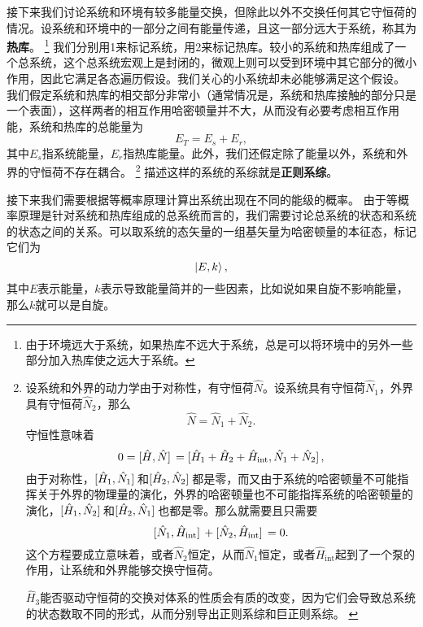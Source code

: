 \documentclass[hyperref, UTF8, a4paper]{ctexart}
\begin{document}
接下来我们讨论系统和环境有较多能量交换，但除此以外不交换任何其它守恒荷的情况。设系统和环境中的一部分之间有能量传递，且这一部分远大于系统，称其为\textbf{热库}。%
\footnote{由于环境远大于系统，如果热库不远大于系统，总是可以将环境中的另外一些部分加入热库使之远大于系统。}%
我们分别用1来标记系统，用2来标记热库。较小的系统和热库组成了一个总系统，这个总系统宏观上是封闭的，微观上则可以受到环境中其它部分的微小作用，因此它满足各态遍历假设。我们关心的小系统却未必能够满足这个假设。
我们假定系统和热库的相交部分非常小（通常情况是，系统和热库接触的部分只是一个表面），这样两者的相互作用哈密顿量并不大，从而没有必要考虑相互作用能，系统和热库的总能量为
\begin{equation}
    E_T = E_s + E_r,
    \label{eq:total-energy}
\end{equation}
其中$E_s$指系统能量，$E_r$指热库能量。此外，我们还假定除了能量以外，系统和外界的守恒荷不存在耦合。%
\footnote{设系统和外界的动力学由于对称性，有守恒荷$\hat{N}$。设系统具有守恒荷$\hat{N}_1$，外界具有守恒荷$\hat{N}_2$，那么
\[
    \hat{N} = \hat{N}_1 + \hat{N}_2.
\]
守恒性意味着
\[
    0 = \comm*{\hat{H}}{\hat{N}} = \comm*{\hat{H}_1 + \hat{H}_2 + \hat{H}_\text{int}}{\hat{N}_1 + \hat{N}_2},
\]
由于对称性，$\comm*{\hat{H}_1}{\hat{N}_1}$和$\comm*{\hat{H}_2}{\hat{N}_2}$都是零，而又由于系统的哈密顿量不可能指挥关于外界的物理量的演化，外界的哈密顿量也不可能指挥系统的哈密顿量的演化，$\comm*{\hat{H}_1}{\hat{N}_2}$和$\comm*{\hat{H}_2}{\hat{N}_1}$也都是零。那么就需要且只需要
\[
    \comm*{\hat{N}_1}{\hat{H}_\text{int}} + \comm*{\hat{N}_2}{\hat{H}_\text{int}} = 0.
\]
这个方程要成立意味着，或者$\hat{N}_2$恒定，从而$\hat{N}_1$恒定，或者$\hat{H}_\text{int}$起到了一个泵的作用，让系统和外界能够交换守恒荷。

$\hat{H}_3$能否驱动守恒荷的交换对体系的性质会有质的改变，因为它们会导致总系统的状态数取不同的形式，从而分别导出正则系综和巨正则系综。
\label{note:without-other-decoupling}}%
描述这样的系统的系综就是\textbf{正则系综}。

接下来我们需要根据等概率原理计算出系统出现在不同的能级的概率。
由于等概率原理是针对系统和热库组成的总系统而言的，我们需要讨论总系统的状态和系统的状态之间的关系。可以取系统的态矢量的一组基矢量为哈密顿量的本征态，标记它们为
\[
    \ket{E, k},
\]
其中$E$表示能量，$k$表示导致能量简并的一些因素，比如说如果自旋不影响能量，那么$k$就可以是自旋。
\end{document}
